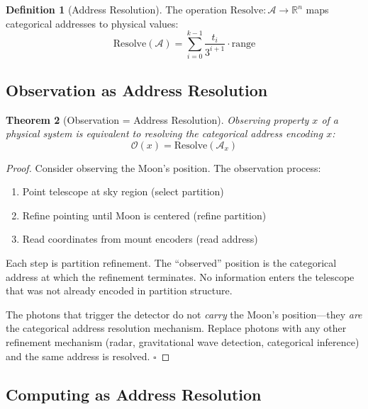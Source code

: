 \documentclass[12pt,a4paper]{article}
\newtheorem{theorem}{Theorem}[section]
\theoremstyle{definition}
\newtheorem{definition}[theorem]{Definition}
\theoremstyle{remark}
\newcommand{\Obs}{\mathcal{O}}
\begin{document}
\begin{definition}[Address Resolution]
The operation $\text{Resolve}: \mathcal{A} \to \mathbb{R}^n$ maps categorical addresses to physical values:
\begin{equation}
\text{Resolve}(\mathcal{A}) = \sum_{i=0}^{k-1} \frac{t_i}{3^{i+1}} \cdot \text{range}
\end{equation}
\end{definition}

\subsection{Observation as Address Resolution}

\begin{theorem}[Observation = Address Resolution]
\label{thm:obs}
Observing property $x$ of a physical system is equivalent to resolving the categorical address encoding $x$:
\begin{equation}
\Obs(x) = \text{Resolve}(\mathcal{A}_x)
\end{equation}
\end{theorem}

\begin{proof}
Consider observing the Moon's position. The observation process:
\begin{enumerate}
    \item Point telescope at sky region (select partition)
    \item Refine pointing until Moon is centered (refine partition)
    \item Read coordinates from mount encoders (read address)
\end{enumerate}

Each step is partition refinement. The ``observed'' position is the categorical address at which the refinement terminates. No information enters the telescope that was not already encoded in partition structure.

The photons that trigger the detector do not \emph{carry} the Moon's position---they \emph{are} the categorical address resolution mechanism. Replace photons with any other refinement mechanism (radar, gravitational wave detection, categorical inference) and the same address is resolved. $\square$
\end{proof}

\subsection{Computing as Address Resolution}
\end{document}
